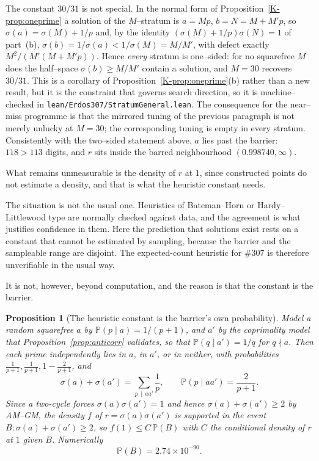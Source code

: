 \documentclass[11pt]{article}
\newtheorem{proposition}[theorem]{Proposition}
\theoremstyle{definition}
\begin{document}
The constant $30/31$ is not special. In the normal form of Proposition~\ref{K-prop:oneprime} a solution
of the $M$--stratum is $a=Mp$, $b=N=M+M'p$, so $\sigma(a)=\sigma(M)+1/p$ and, by the identity
$(\sigma(M)+1/p)\sigma(N)=1$ of part~(b), $\sigma(b)=1/\sigma(a)<1/\sigma(M)=M/M'$, with defect
exactly $M^2/(M'(M+M'p))$. Hence \emph{every} stratum is one--sided: for no squarefree $M$ does the
half--space $\sigma(b)\ge M/M'$ contain a solution, and $M=30$ recovers $30/31$. This is a corollary
of Proposition~\ref{K-prop:oneprime}(b) rather than a new result, but it is the constraint that governs
search direction, so it is machine--checked in \texttt{lean/Erdos307/StratumGeneral.lean}. The
consequence for the near--miss programme is that the mirrored tuning of the previous paragraph is not
merely unlucky at $M=30$; the corresponding tuning is empty in every stratum. Consistently with the two--sided statement above, $a$
lies past the barrier: $118>113$ digits, and $r$ sits inside the barred neighbourhood
$(0.998740,\infty)$.

What remains unmeasurable is the density of $r$ at $1$,
since constructed points do not estimate a density, and that is what the heuristic constant needs.

The situation is not the usual one. Heuristics of Bateman--Horn or Hardy--Littlewood
type are normally checked against data, and the agreement is what justifies confidence in them. Here
the prediction that solutions exist rests on a constant that cannot be estimated by sampling,
because the barrier and the sampleable range are disjoint. The expected-count heuristic for \#307 is
therefore unverifiable in the usual way.

It is not, however, beyond computation, and the reason is that the constant is the barrier.

\begin{proposition}[The heuristic constant is the barrier's own probability]\label{prop:f1}
Model a random squarefree $a$ by $\mathbb{P}(p\mid a)=1/(p+1)$, and $a'$ by the coprimality model
that Proposition~\textup{\ref{prop:anticorr}} validates, so that $\mathbb{P}(q\mid a')=1/q$ for
$q\nmid a$. Then each prime independently lies in $a$, in $a'$, or in neither, with probabilities
$\tfrac1{p+1},\tfrac1{p+1},1-\tfrac2{p+1}$, and
\[ \sigma(a)+\sigma(a')=\sum_{p\,\mid\,aa'}\frac1p,\qquad \mathbb{P}(p\mid aa')=\frac2{p+1}. \]
Since a two-cycle forces $\sigma(a)\sigma(a')=1$ and hence $\sigma(a)+\sigma(a')\ge2$ by
\textup{AM--GM}, the density $f$ of $r=\sigma(a)\sigma(a')$ is supported in the event
$B:\sigma(a)+\sigma(a')\ge2$, so $f(1)\le C\,\mathbb{P}(B)$ with $C$ the conditional density of $r$
at $1$ given $B$. Numerically
\[ \mathbb{P}(B)=2.74\times10^{-90}. \]
\end{proposition}
\end{document}
